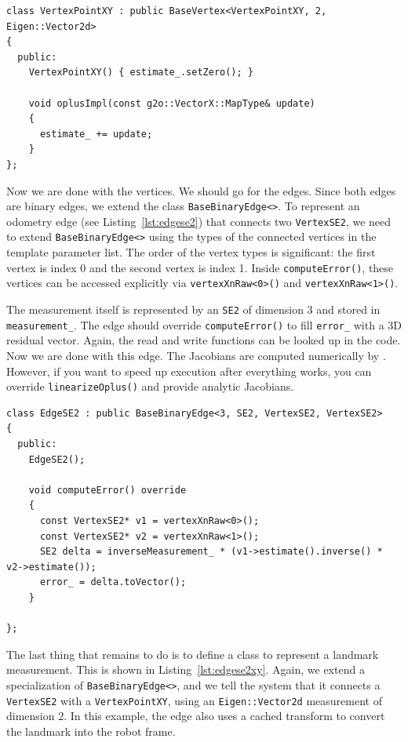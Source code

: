 \documentclass[a4paper]{article}
\begin{document}
\begin{lstlisting}[float,label=lst:vertexxy,caption=Vertex representing
  a 2D landmark]
class VertexPointXY : public BaseVertex<VertexPointXY, 2, Eigen::Vector2d>
{
  public:
    VertexPointXY() { estimate_.setZero(); }

    void oplusImpl(const g2o::VectorX::MapType& update)
    {
      estimate_ += update;
    }
};
\end{lstlisting}

Now we are done with the vertices. We should go for the edges. Since
both edges are binary edges, we extend the class \verb+BaseBinaryEdge<>+.
To represent an odometry edge (see Listing~\ref{lst:edgese2}) that
connects two \verb+VertexSE2+, we need to extend \verb+BaseBinaryEdge<>+
using the types of the connected vertices in the template parameter list.
The order of the vertex types is significant: the first vertex is index
0 and the second vertex is index 1. Inside \verb+computeError()+, these
vertices can be accessed explicitly via \verb+vertexXnRaw<0>()+ and
\verb+vertexXnRaw<1>()+.

The measurement itself is represented by an \verb+SE2+ of dimension 3
and stored in \verb+measurement_+. The edge should override
\verb+computeError()+ to fill \verb+error_+ with a 3D residual vector.
Again, the read and write functions can be looked up in the code.
Now we are done with this edge. The Jacobians are computed numerically
by \gopt{}. However, if you want to speed up execution after everything
works, you can override \verb+linearizeOplus()+ and provide analytic
Jacobians.

\begin{lstlisting}[float,label=lst:edgese2,caption=\text{Edge connecting two
  robot poses, for example, the odometry of the robot.}]
class EdgeSE2 : public BaseBinaryEdge<3, SE2, VertexSE2, VertexSE2>
{
  public:
    EdgeSE2();

    void computeError() override
    {
      const VertexSE2* v1 = vertexXnRaw<0>();
      const VertexSE2* v2 = vertexXnRaw<1>();
      SE2 delta = inverseMeasurement_ * (v1->estimate().inverse() * v2->estimate());
      error_ = delta.toVector();
    }

};
\end{lstlisting}

The last thing that remains to do is to define a class to represent a
landmark measurement. This is shown in Listing~\ref{lst:edgese2xy}.
Again, we extend a specialization of \verb+BaseBinaryEdge<>+, and we
tell the system that it connects a \verb+VertexSE2+ with a
\verb+VertexPointXY+, using an \verb+Eigen::Vector2d+ measurement of
dimension 2. In this example, the edge also uses a cached transform to
convert the landmark into the robot frame.
\end{document}
